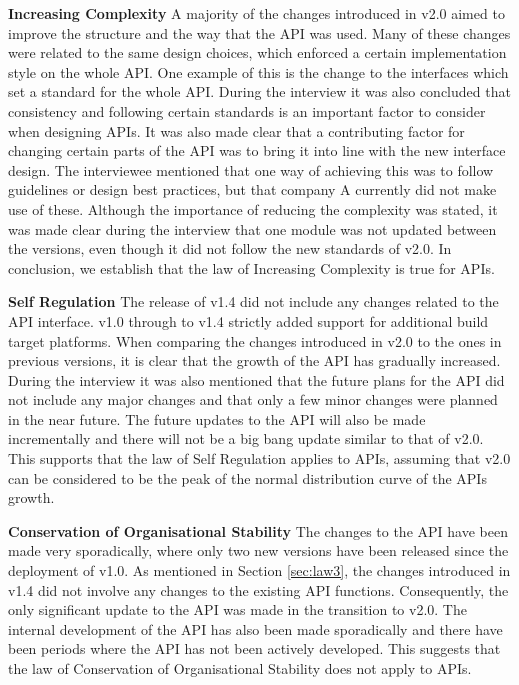 \documentclass{sig-alternate}
\begin{document}
\smallskip \noindent
\textbf{Increasing Complexity  } \label{sec:law2} 
A majority of the changes introduced in v2.0 aimed to improve the structure and the way that the API was used. Many of these changes were related to the same design choices, which enforced a certain implementation style on the whole API. One example of this is the change to the interfaces which set a standard for the whole API. During the interview it was also concluded that consistency and following certain standards is an important factor to consider when designing APIs. It was also made clear that a contributing factor for changing certain parts of the API was to bring it into line with the new interface design. The interviewee mentioned that one way of achieving this was to follow guidelines or design best practices, but that company A currently did not make use of these. Although the importance of reducing the complexity was stated, it was made clear during the interview that one module was not updated between the versions, even though it did not follow the new standards of v2.0. In conclusion, we establish that the law of Increasing Complexity is true for APIs. 

\smallskip \noindent
\textbf{Self Regulation  } \label{sec:law3} 
The release of v1.4 did not include any changes related to the API interface. v1.0 through to v1.4 strictly added support for additional build target platforms. When comparing the changes introduced in v2.0 to the ones in previous versions, it is clear that the growth of the API has gradually increased. During the interview it was also mentioned that the future plans for the API did not include any major changes and that only a few minor changes were planned in the near future. The future updates to the API will also be made incrementally and there will not be a big bang update similar to that of v2.0. This supports that the law of Self Regulation applies to APIs, assuming that v2.0 can be considered to be the peak of the normal distribution curve of the APIs growth. 

\smallskip \noindent
\textbf{Conservation of Organisational Stability  } 
The changes to the API have been made very sporadically, where only two new versions have been released since the deployment of v1.0. As mentioned in Section \ref{sec:law3}, the changes introduced in v1.4 did not involve any changes to the existing API functions. Consequently, the only significant update to the API was made in the transition to v2.0. The internal development of the API has also been made sporadically and there have been periods where the API has not been actively developed. This suggests that the law of Conservation of Organisational Stability does not apply to APIs. 
\end{document}
